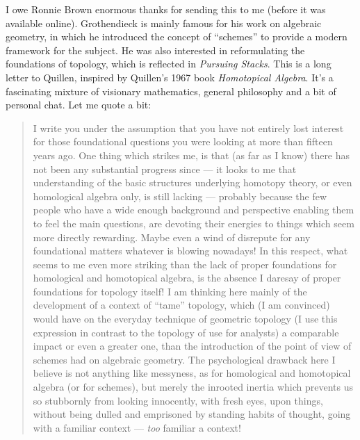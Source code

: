 \documentclass[12pt]{article}
\def\tightlist{}
\renewcommand{\texttt}[1]{%
  \begingroup
  \ttfamily
  \begingroup\lccode`~=`/\lowercase{\endgroup\def~}{/\discretionary{}{}{}}%
  \begingroup\lccode`~=`[\lowercase{\endgroup\def~}{[\discretionary{}{}{}}%
  \begingroup\lccode`~=`.\lowercase{\endgroup\def~}{.\discretionary{}{}{}}%
  \catcode`/=\active\catcode`[=\active\catcode`.=\active
  \scantokens{#1\noexpand}%
  \endgroup
}
\begin{document}
\noindent
I owe Ronnie Brown enormous thanks for sending this to me (before it was
available online).   Grothendieck
is mainly famous for his work on algebraic geometry, in which he
introduced the concept of ``schemes'' to provide a modern framework for
the subject. He was also interested in reformulating the foundations of
topology, which is reflected in \emph{Pursuing Stacks}. This is a long
letter to Quillen, inspired by Quillen's 1967 book \emph{Homotopical
Algebra}. It's a fascinating mixture of visionary mathematics, general
philosophy and a bit of personal chat. Let me quote a bit:

\begin{quote}
I write you under the assumption that you have not entirely lost
interest for those foundational questions you were looking at more than
fifteen years ago. One thing which strikes me, is that (as far as I
know) there has not been any substantial progress since --- it looks to
me that understanding of the basic structures underlying homotopy
theory, or even homological algebra only, is still lacking --- probably
because the few people who have a wide enough background and perspective
enabling them to feel the main questions, are devoting their energies to
things which seem more directly rewarding. Maybe even a wind of
disrepute for any foundational matters whatever is blowing nowadays! In
this respect, what seems to me even more striking than the lack of
proper foundations for homological and homotopical algebra, is the
absence I daresay of proper foundations for topology itself! I am
thinking here mainly of the development of a context of ``tame''
topology, which (I am convinced) would have on the everyday technique of
geometric topology (I use this expression in contrast to the topology of
use for analysts) a comparable impact or even a greater one, than the
introduction of the point of view of schemes had on algebraic geometry.
The psychological drawback here I believe is not anything like
messyness, as for homological and homotopical algebra (or for schemes),
but merely the inrooted inertia which prevents us so stubbornly from
looking innocently, with fresh eyes, upon things, without being dulled
and emprisoned by standing habits of thought, going with a familiar
context --- \emph{too} familiar a context!
\end{quote}
\end{document}
